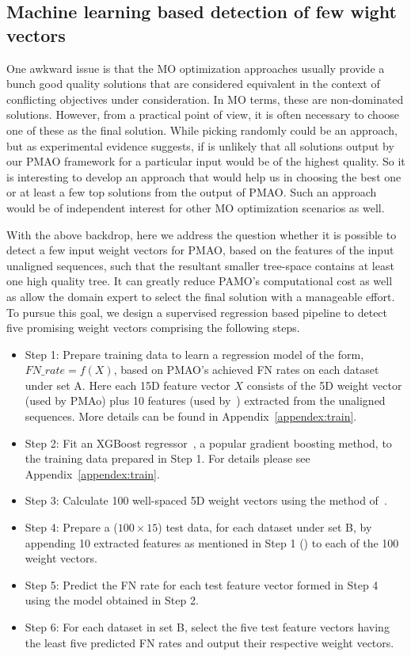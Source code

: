 \subsection{Machine learning based detection of few wight vectors}
One awkward issue is that the MO optimization approaches usually provide a bunch good quality solutions that are considered equivalent in the context of conflicting objectives under consideration. In MO terms, these are non-dominated solutions. However, from a practical point of view, it is often necessary to choose one of these as the final solution. While picking randomly could be an approach, but as experimental evidence suggests, if is unlikely that all solutions output by our PMAO framework for a particular input would be of the highest quality. So it is interesting to develop an approach that would help us in choosing the best one or at least a few top solutions from the output of PMAO. Such an approach would be of independent interest for other MO optimization scenarios as well.   

With the above backdrop, here we address the question whether it is possible to detect a few input weight vectors for PMAO, based on the features of the input unaligned sequences, such that the resultant smaller tree-space contains at least one high quality tree. It can greatly reduce PAMO's computational cost as well as allow the domain expert to select the final solution with a manageable effort. To pursue this goal, we design a supervised regression based pipeline to detect five promising weight vectors comprising the following steps.
\begin{itemize}
	\item Step 1: Prepare training data to learn a regression model of the form, $FN\_rate = f(X)$, based on PMAO's achieved FN rates on each dataset under set A. Here each 15D feature vector $X$ consists of the 5D weight vector (used by PMAo) plus 10 features (used by~\cite{rubio2018characteristic}) extracted from the unaligned sequences. More details can be found in Appendix~\ref{appendex:train}. 
	\item Step 2: Fit an XGBoost regressor~\cite{bibid}, a popular gradient boosting method, to the training data prepared in Step 1. For details please see Appendix~\ref{appendex:train}. 
	\item Step 3: Calculate 100 well-spaced 5D weight vectors using the method of~\cite{ref_dirs_energy}.
	\item Step 4: Prepare a ($100 \times 15$) test data, for each dataset under set B, by appending 10 extracted features as mentioned in Step 1 (\cite{rubio2018characteristic}) to each of the 100 weight vectors.
	\item Step 5: Predict the FN rate for each test feature vector formed in Step 4 using the model obtained in Step 2. 
	\item Step 6: For each dataset in set B, select the five test feature vectors having the least five predicted FN rates and output their respective weight vectors.
\end{itemize}

